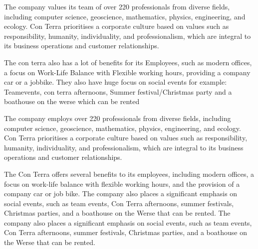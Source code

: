 \documentclass[11pt, titlepage, a4paper]{article}
\begin{document}
The company values its team of over 220 professionals from diverse fields, including computer science, geoscience, mathematics, physics, engineering, and ecology. Con Terra prioritises a corporate culture based on values such as responsibility, humanity, individuality, and professionalism, which are integral to its business operations and customer relationships.

The con terra also has a lot of benefits for its Employees, such as modern offices, a focus on Work-Life Balance with Flexible working hours, providing a company car or a jobbike. They also have huge focus on social events for example: Teamevents, con terra afternoons, Summer festival/Christmas party and a boathouse on the werse which can be rented


The company employs over 220 professionals from diverse fields, including computer science, geoscience, mathematics, physics, engineering, and ecology. Con Terra prioritises a corporate culture based on values such as responsibility, humanity, individuality, and professionalism, which are integral to its business operations and customer relationships.

The Con Terra offers several benefits to its employees, including modern offices, a focus on work-life balance with flexible working hours, and the provision of a company car or job bike. The company also places a significant emphasis on social events, such as team events, Con Terra afternoons, summer festivals, Christmas parties, and a boathouse on the Werse that can be rented. The company also places a significant emphasis on social events, such as team events, Con Terra afternoons, summer festivals, Christmas parties, and a boathouse on the Werse that can be rented.


\clearpage
\end{document}
